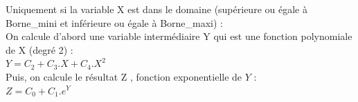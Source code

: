 Uniquement si la variable X est dans le domaine (sup\'erieure ou \'egale \`a Borne\_mini et inf\'erieure ou \'egale \`a Borne\_maxi) : \\
On calcule d'abord une variable interm\'ediaire Y qui est une fonction polynomiale de X (degr\'e 2) : \\
\hspace*{2cm} $Y = C_2 + C_3 . X + C_4 . X^2$ \\
Puis, on calcule le r\'esultat Z , fonction exponentielle de $Y$ : \\
\hspace*{2cm} $Z = C_0 + C_1 . e^Y$ \\

